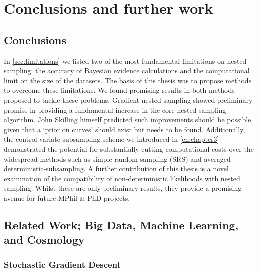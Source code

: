 \chapter{Conclusions and further work}\label{ch:chapter5}

\ifpdf
    \graphicspath{{Chapter5/Figs/Raster/}{Chapter5/Figs/PDF/}{Chapter5/Figs/}}
\else
    \graphicspath{{Chapter5/Figs/Vector/}{Chapter5/Figs/}}
\fi

\section{Conclusions}

In \cref{sec:limitations} we listed two of the most fundamental limitations on nested sampling: the accuracy of Bayesian evidence calculations and the computational limit on the size of the datasets. The basis of this thesis was to propose methods to overcome these limitations. We found promising results in both methods proposed to tackle these problems. Gradient nested sampling showed preliminary promise in providing a fundamental increase in the core nested sampling algorithm. John Skilling himself predicted such improvements should be possible, given that a `prior on curves' should exist but needs to be found. Additionally, the control variate subsampling scheme we introduced in \cref{ch:chapter3} demonstrated the potential for substantially cutting computational costs over the widespread methods such as simple random sampling (SRS) and averaged-deterministic-subsampling. A further contribution of this thesis is a novel examination of the compatibility of non-deterministic likelihoods with nested sampling. Whilst these are only preliminary results, they provide a promising avenue for future MPhil \& PhD projects. 

\section{Related Work; Big Data, Machine Learning, and Cosmology}

\subsection{Stochastic Gradient Descent}


